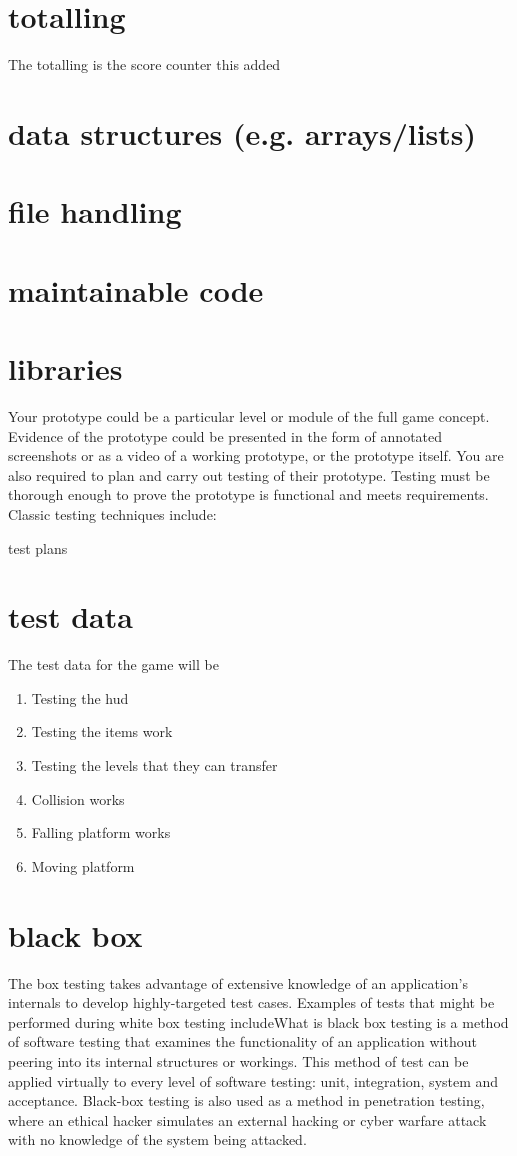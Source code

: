 \documentclass{article}
\begin{document}
\section{totalling}
The totalling is the score counter this added 

\section{data structures (e.g. arrays/lists)}


\section{file handling}


\section{maintainable code}


\section{libraries}

Your prototype could be a particular level or module of the full game concept. Evidence of the
prototype could be presented in the form of annotated screenshots or as a video of a working
prototype, or the prototype itself.
You are also required to plan and carry out testing of their prototype. Testing must be thorough
enough to prove the prototype is functional and meets requirements. Classic testing techniques
include:

test plans
\section{test data}
The test data for the game will be
\begin{enumerate}
	\item Testing the hud
	\item Testing the items work
	\item Testing the levels that they can transfer
	\item Collision works
	\item Falling platform works
	\item Moving platform
\end{enumerate}

\section{black box}
The box testing takes advantage of extensive knowledge of an application’s internals to develop highly-targeted test cases. Examples of tests that might be performed during white box testing includeWhat is black box testing is a method of software testing that examines the functionality of an application without peering into its internal structures or workings. This method of test can be applied virtually to every level of software testing: unit, integration, system and acceptance. Black-box testing is also used as a method in penetration testing, where an ethical hacker simulates an external hacking or cyber warfare attack with no knowledge of the system being attacked. 
\end{document}
